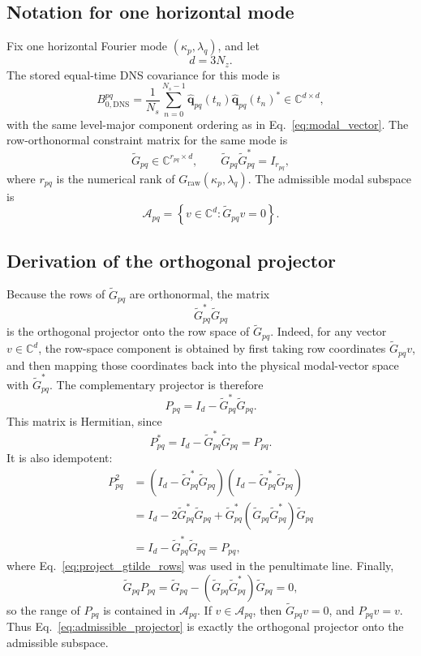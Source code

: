 \documentclass[11pt]{article}
\newcommand{\bfq}{\bm{q}}
\newcommand{\Graw}{G_{\mathrm{raw}}}
\newcommand{\Gtilde}{\widetilde{G}}
\newcommand{\Bzero}{B_{0,\mathrm{DNS}}}
\newcommand{\Pmat}{P}
\begin{document}
\subsection{Notation for one horizontal mode}

Fix one horizontal Fourier mode \((\kappa_p,\lambda_q)\), and let
\[
  d = 3N_z.
\]
The stored equal-time DNS covariance for this mode is
\[
  \Bzero^{pq}
  =
  \frac{1}{N_s}
  \sum_{n=0}^{N_s-1}
  \widehat{\bfq}_{pq}(t_n)
  \widehat{\bfq}_{pq}(t_n)^*
  \in\mathbb{C}^{d\times d},
  \label{eq:project_b0_definition}
\]
with the same level-major component ordering as in
Eq.~\eqref{eq:modal_vector}. The row-orthonormal constraint matrix for the
same mode is
\begin{equation}
  \Gtilde_{pq}\in\mathbb{C}^{r_{pq}\times d},
  \qquad
  \Gtilde_{pq}\Gtilde_{pq}^*=I_{r_{pq}},
  \label{eq:project_gtilde_rows}
\end{equation}
where \(r_{pq}\) is the numerical rank of \(\Graw(\kappa_p,\lambda_q)\).
The admissible modal subspace is
\[
  \mathcal{A}_{pq}
  =
  \left\{v\in\mathbb{C}^{d}:\Gtilde_{pq}v=0\right\}.
  \label{eq:admissible_subspace}
\]

\subsection{Derivation of the orthogonal projector}

Because the rows of \(\Gtilde_{pq}\) are orthonormal, the matrix
\[
  \Gtilde_{pq}^*\Gtilde_{pq}
\]
is the orthogonal projector onto the row space of \(\Gtilde_{pq}\). Indeed,
for any vector \(v\in\mathbb{C}^d\), the row-space component is obtained by
first taking row coordinates \(\Gtilde_{pq}v\), and then mapping those
coordinates back into the physical modal-vector space with \(\Gtilde_{pq}^*\).
The complementary projector is therefore
\begin{equation}
  \Pmat_{pq}
  =
  I_d-\Gtilde_{pq}^*\Gtilde_{pq}.
  \label{eq:admissible_projector}
\end{equation}
This matrix is Hermitian, since
\[
  \Pmat_{pq}^*
  =
  I_d-\Gtilde_{pq}^*\Gtilde_{pq}
  =
  \Pmat_{pq}.
\]
It is also idempotent:
\begin{align}
  \Pmat_{pq}^2
  &=
  \left(I_d-\Gtilde_{pq}^*\Gtilde_{pq}\right)
  \left(I_d-\Gtilde_{pq}^*\Gtilde_{pq}\right) \nonumber\\
  &=
  I_d-2\Gtilde_{pq}^*\Gtilde_{pq}
  +\Gtilde_{pq}^*
   \left(\Gtilde_{pq}\Gtilde_{pq}^*\right)
   \Gtilde_{pq} \nonumber\\
  &=
  I_d-\Gtilde_{pq}^*\Gtilde_{pq}
  =
  \Pmat_{pq},
  \label{eq:projector_idempotent}
\end{align}
where Eq.~\eqref{eq:project_gtilde_rows} was used in the penultimate line.
Finally,
\[
  \Gtilde_{pq}\Pmat_{pq}
  =
  \Gtilde_{pq}
  -
  \left(\Gtilde_{pq}\Gtilde_{pq}^*\right)\Gtilde_{pq}
  =
  0,
\]
so the range of \(\Pmat_{pq}\) is contained in \(\mathcal{A}_{pq}\). If
\(v\in\mathcal{A}_{pq}\), then \(\Gtilde_{pq}v=0\), and
\(\Pmat_{pq}v=v\). Thus Eq.~\eqref{eq:admissible_projector} is exactly the
orthogonal projector onto the admissible subspace.
\end{document}
